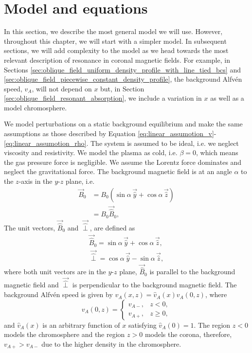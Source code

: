 \section{Model and equations}
\label{sec:chap_4_model_and_eqns}

In this section, we describe the most general model we will use. However, throughout this chapter, we will start with a simpler model. In subsequent sections, we will add complexity to the model as we head
towards the most relevant description of resonance in coronal magnetic fields. For example, in Sections \ref{sec:oblique_field_uniform_density_profile_with_line_tied_bcs} and \ref{sec:oblique_field_piecewise_constant_density_profile}, the background Alfv\'en speed, $v_A$, will not depend on $x$ but, in Section \ref{sec:oblique_field_resonant_absorption}, we include a variation in $x$ as well as a model chromosphere. 

We model perturbations on a static background equilibrium and make the same assumptions as those described by Equation \eqref{eq:linear_assumotion_v}-\eqref{eq:linear_assumotion_rho}. The system is assumed to be ideal, i.e. we neglect viscosity and resistivity. We model the plasma as cold, i.e. $\beta=0$, which means the gas pressure force is negligible. We assume the Lorentz force dominates and neglect the gravitational force. The background magnetic field is at an angle $\alpha$ to the $z$-axis in the $y$-$z$ plane, i.e.
\begin{equation}
    \label{eq:chap_4_background_field}
    \begin{aligned}
    \vec{B}_0 &= B_0(\sin\alpha\,\vec{\hat{y}}+\cos\alpha\,\vec{\hat{z}}) \\
    &= B_0\vec{\hat{B}}_0,
    \end{aligned}
\end{equation}
The unit vectors, $\vec{\hat{B}}_0$ and $\vec{\hat{\perp}}$, are defined as
\begin{gather}
    \vec{\hat{B}}_0 = \sin\alpha\,\vec{\hat{y}}+\cos\alpha\,\vec{\hat{z}}, \\
    \vec{\hat{\perp}} = \cos\alpha\,\vec{\hat{y}}-\sin\alpha\,\vec{\hat{z}},
\end{gather}
where both unit vectors are in the $y$-$z$ plane, $\vec{\hat{B}}_0$ is parallel to the background magnetic field and $\vec{\hat{\perp}}$ is perpendicular to the background magnetic field. 
The background Alfv\'en speed is given by $v_A(x,z) = \hat{v}_A(x)v_{A}(0,z)$, where
\begin{equation}
    \label{eq:chap_4_vA(0,z)}
    v_A(0,z)= \begin{cases}
    v_{A-}, & z < 0, \\
    v_{A+}, & z \ge 0,
    \end{cases}
\end{equation}
and $\hat{v}_A(x)$ is an arbitrary function of $x$ satisfying $\hat{v}_A(0)=1$. The region $z<0$ models the chromosphere and the region $z>0$ models the corona, therefore, $v_{A+}>v_{A-}$ due to the higher density in the chromosphere.

